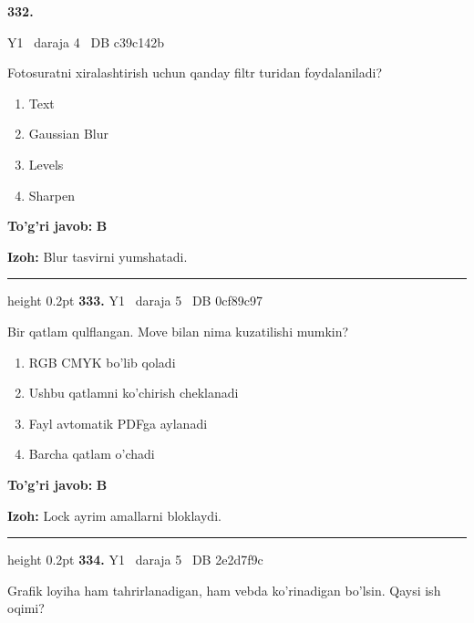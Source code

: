 \documentclass[10pt,a4paper,oneside]{article}
\begin{document}
\hypertarget{q332}{\textbf{\color{ink}332.}}  {\color{muted}\scriptsize Y1 \textbullet\ daraja 4 \textbullet\ DB c39c142b}
\par
Fotosuratni xiralashtirish uchun qanday filtr turidan foydalaniladi?
\begin{enumerate}[label=\Alph*),leftmargin=9mm]
\item Text
\item Gaussian Blur
\item Levels
\item Sharpen
\end{enumerate}
\begin{tcolorbox}[enhanced,breakable,colback=teal!4,colframe=teal!45!black,boxrule=0.45pt,arc=1.2mm,left=2.8mm,right=2.8mm,top=2mm,bottom=2mm,before skip=2mm,after skip=2mm]
\textbf{\color{teal}To'g'ri javob:} \textbf{B}
\par\smallskip
\textbf{Izoh:} Blur tasvirni yumshatadi.
\end{tcolorbox}
\vspace{2mm}\hrule height 0.2pt \vspace{4mm}
\hypertarget{q333}{\textbf{\color{ink}333.}}  {\color{muted}\scriptsize Y1 \textbullet\ daraja 5 \textbullet\ DB 0cf89c97}
\par
Bir qatlam qulflangan. Move bilan nima kuzatilishi mumkin?
\begin{enumerate}[label=\Alph*),leftmargin=9mm]
\item RGB CMYK bo'lib qoladi
\item Ushbu qatlamni ko'chirish cheklanadi
\item Fayl avtomatik PDFga aylanadi
\item Barcha qatlam o'chadi
\end{enumerate}
\begin{tcolorbox}[enhanced,breakable,colback=teal!4,colframe=teal!45!black,boxrule=0.45pt,arc=1.2mm,left=2.8mm,right=2.8mm,top=2mm,bottom=2mm,before skip=2mm,after skip=2mm]
\textbf{\color{teal}To'g'ri javob:} \textbf{B}
\par\smallskip
\textbf{Izoh:} Lock ayrim amallarni bloklaydi.
\end{tcolorbox}
\vspace{2mm}\hrule height 0.2pt \vspace{4mm}
\hypertarget{q334}{\textbf{\color{ink}334.}}  {\color{muted}\scriptsize Y1 \textbullet\ daraja 5 \textbullet\ DB 2e2d7f9c}
\par
Grafik loyiha ham tahrirlanadigan, ham vebda ko'rinadigan bo'lsin. Qaysi ish oqimi?
\end{document}
